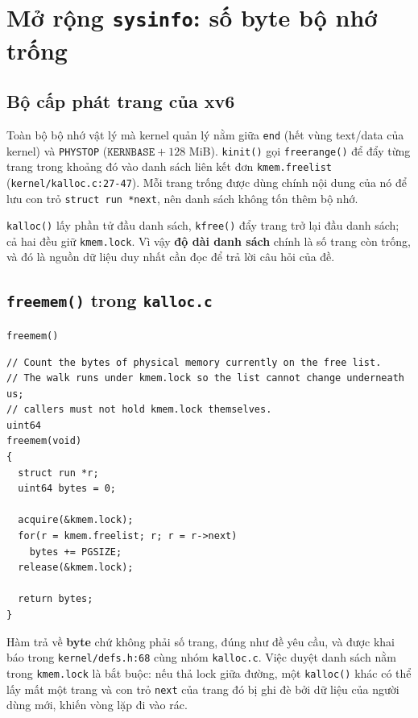 \chapter{Mở rộng \texttt{sysinfo}: số byte bộ nhớ trống}

\newpage

\section{Bộ cấp phát trang của xv6}

Toàn bộ bộ nhớ vật lý mà kernel quản lý nằm giữa \texttt{end} (hết vùng text/data của kernel) và \texttt{PHYSTOP} ($\texttt{KERNBASE} + 128$ MiB). \texttt{kinit()} gọi \texttt{freerange()} để đẩy từng trang trong khoảng đó vào danh sách liên kết đơn \texttt{kmem.freelist} (\texttt{kernel/kalloc.c:27-47}). Mỗi trang trống được dùng chính nội dung của nó để lưu con trỏ \texttt{struct run *next}, nên danh sách không tốn thêm bộ nhớ.

\texttt{kalloc()} lấy phần tử đầu danh sách, \texttt{kfree()} đẩy trang trở lại đầu danh sách; cả hai đều giữ \texttt{kmem.lock}. Vì vậy \textbf{độ dài danh sách} chính là số trang còn trống, và đó là nguồn dữ liệu duy nhất cần đọc để trả lời câu hỏi của đề.

\section{\texttt{freemem()} trong \texttt{kalloc.c}}

\begin{codebox}[freemem]{\texttt{freemem()}}
    \begin{verbatim}
// Count the bytes of physical memory currently on the free list.
// The walk runs under kmem.lock so the list cannot change underneath us;
// callers must not hold kmem.lock themselves.
uint64
freemem(void)
{
  struct run *r;
  uint64 bytes = 0;

  acquire(&kmem.lock);
  for(r = kmem.freelist; r; r = r->next)
    bytes += PGSIZE;
  release(&kmem.lock);

  return bytes;
}
    \end{verbatim}
\end{codebox}

Hàm trả về \textbf{byte} chứ không phải số trang, đúng như đề yêu cầu, và được khai báo trong \texttt{kernel/defs.h:68} cùng nhóm \texttt{kalloc.c}. Việc duyệt danh sách nằm trong \texttt{kmem.lock} là bắt buộc: nếu thả lock giữa đường, một \texttt{kalloc()} khác có thể lấy mất một trang và con trỏ \texttt{next} của trang đó bị ghi đè bởi dữ liệu của người dùng mới, khiến vòng lặp đi vào rác.

